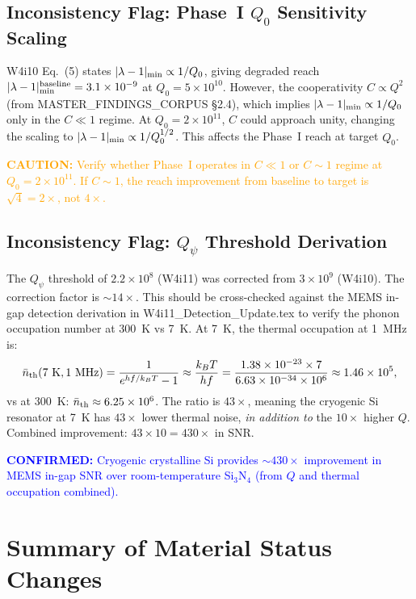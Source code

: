 \documentclass[11pt]{article}
\theoremstyle{definition}
\theoremstyle{remark}
\newcommand{\ee}[1]{\times 10^{#1}}
\newcommand{\Qpsi}{Q_\psi}
\newcommand{\lam}{|\lambda-1|}
\newcommand{\confirmed}[1]{\textcolor{blue}{\textbf{CONFIRMED:} #1}}
\newcommand{\caution}[1]{\textcolor{orange}{\textbf{CAUTION:} #1}}
\begin{document}
\subsection{Inconsistency Flag: Phase~I $Q_0$ Sensitivity Scaling}

W4i10 Eq.~(5) states $\lam_{\rm min} \propto 1/Q_0$, giving
degraded reach $\lam_{\rm min}^{\rm baseline} = 3.1\ee{-9}$ at
$Q_0 = 5\ee{10}$. However, the cooperativity $C \propto Q^2$
(from MASTER\_FINDINGS\_CORPUS \S2.4), which implies $\lam_{\rm min}
\propto 1/Q_0$ only in the $C \ll 1$ regime. At $Q_0 = 2\ee{11}$,
$C$ could approach unity, changing the scaling to $\lam_{\rm min}
\propto 1/Q_0^{1/2}$. This affects the Phase~I reach at target $Q_0$.

\caution{Verify whether Phase~I operates in $C \ll 1$ or $C \sim 1$
regime at $Q_0 = 2\ee{11}$. If $C \sim 1$, the reach improvement
from baseline to target is $\sqrt{4} = 2\times$, not $4\times$.}

\subsection{Inconsistency Flag: $Q_\psi$ Threshold Derivation}

The $\Qpsi$ threshold of $2.2\ee{8}$ (W4i11) was corrected from
$3\ee{9}$ (W4i10). The correction factor is $\sim 14\times$. This
should be cross-checked against the MEMS in-gap detection derivation
in W4i11\_Detection\_Update.tex to verify the phonon occupation
number at 300~K vs 7~K. At 7~K, the thermal occupation at 1~MHz is:
\begin{equation}
\bar{n}_{\rm th}(7~{\rm K}, 1~{\rm MHz})
= \frac{1}{e^{h f / k_B T} - 1}
\approx \frac{k_B T}{h f}
= \frac{1.38\ee{-23} \times 7}{6.63\ee{-34} \times 10^6}
\approx 1.46\ee{5},
\label{eq:nbar_cryo}
\end{equation}
vs at 300~K: $\bar{n}_{\rm th} \approx 6.25\ee{6}$. The ratio is
$43\times$, meaning the cryogenic Si resonator at 7~K has $43\times$
lower thermal noise, \textit{in addition to} the $10\times$ higher $Q$.
Combined improvement: $43 \times 10 = 430\times$ in SNR.

\confirmed{Cryogenic crystalline Si provides $\sim 430\times$
improvement in MEMS in-gap SNR over room-temperature Si$_3$N$_4$
(from $Q$ and thermal occupation combined).}


\section{Summary of Material Status Changes}
\label{sec:changes}
\end{document}
